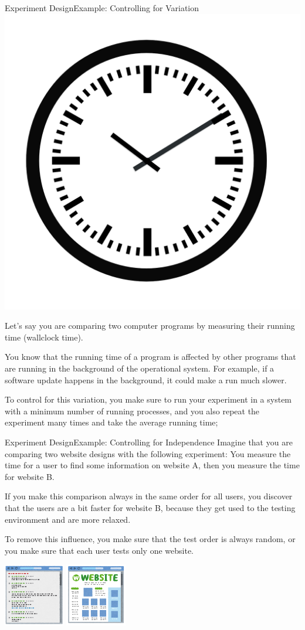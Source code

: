 \documentclass{beamer}
\begin{document}
\begin{CJK}{UTF8}{ipxm}
\begin{frame}{Experiment Design}{Example: Controlling for Variation}
  \hfill\includegraphics[width=.2\textwidth]{../img/pixabay_clock}

  Let's say you are comparing two computer programs by measuring their running time (wallclock time).
  \bigskip

  You know that the running time of a program is affected by other programs that are running in the background of the operational system. For example, if a software update happens in the background, it could make a run much slower.
  \bigskip

  To control for this variation, you make sure to run your experiment in a system with a minimum number of running processes, and you also repeat the experiment many times and take the average running time;
\end{frame}

\begin{frame}{Experiment Design}{Example: Controlling for Independence}
  Imagine that you are comparing two website designs with the following experiment: You measure the time for a user to find some information on website A, then you measure the time for website B. \bigskip

  If you make this comparison always in the same order for all users, you discover that the users are a bit faster for website B, because they get used to the testing environment and are more relaxed. \bigskip

  To remove this influence, you make sure that the test order is always random, or you make sure that each user tests only one website.

  \begin{center}
    \includegraphics[width=0.2\textwidth]{../img/irasutoya_website1}\hspace{1cm}
    \includegraphics[width=0.2\textwidth]{../img/irasutoya_website2}
  \end{center}
\end{frame}


\end{CJK}
\end{document}
